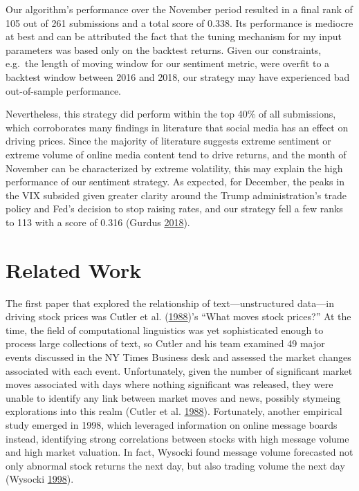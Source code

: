 \documentclass[11,]{article}
\begin{document}
Our algorithm's performance over the November period resulted in a final
rank of 105 out of 261 submissions and a total score of 0.338. Its
performance is mediocre at best and can be attributed the fact that the
tuning mechanism for my input parameters was based only on the backtest
returns. Given our constraints, e.g.~the length of moving window for our
sentiment metric, were overfit to a backtest window between 2016 and
2018, our strategy may have experienced bad out-of-sample performance.

Nevertheless, this strategy did perform within the top 40\% of all
submissions, which corroborates many findings in literature that social
media has an effect on driving prices. Since the majority of literature
suggests extreme sentiment or extreme volume of online media content
tend to drive returns, and the month of November can be characterized by
extreme volatility, this may explain the high performance of our
sentiment strategy. As expected, for December, the peaks in the VIX
subsided given greater clarity around the Trump administration's trade
policy and Fed's decision to stop raising rates, and our strategy fell a
few ranks to 113 with a score of 0.316 (Gurdus
\protect\hyperlink{ref-cramer2018}{2018}).

\hypertarget{related-work}{%
\section{Related Work}\label{related-work}}

The first paper that explored the relationship of text---unstructured
data---in driving stock prices was Cutler et al.
(\protect\hyperlink{ref-cutler1988}{1988})'s ``What moves stock
prices?'' At the time, the field of computational linguistics was yet
sophisticated enough to process large collections of text, so Cutler and
his team examined 49 major events discussed in the NY Times Business
desk and assessed the market changes associated with each event.
Unfortunately, given the number of significant market moves associated
with days where nothing significant was released, they were unable to
identify any link between market moves and news, possibly stymeing
explorations into this realm (Cutler et al.
\protect\hyperlink{ref-cutler1988}{1988}). Fortunately, another
empirical study emerged in 1998, which leveraged information on online
message boards instead, identifying strong correlations between stocks
with high message volume and high market valuation. In fact, Wysocki
found message volume forecasted not only abnormal stock returns the next
day, but also trading volume the next day (Wysocki
\protect\hyperlink{ref-wysocki1998}{1998}).
\end{document}
